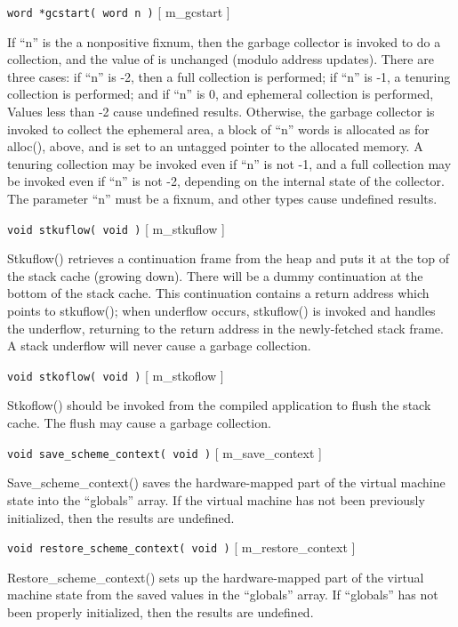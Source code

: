 \begin{description}
\item {{\tt word *gcstart( word n )} \hfill [ {\sc m\_gcstart} ] }

If ``n'' is the a nonpositive fixnum, then the garbage collector is
invoked to do a collection, and the value of  is unchanged
(modulo address updates). There are three cases: if ``n'' is -2, then
a full collection is performed; if ``n'' is -1, a tenuring collection
is performed; and if ``n'' is 0, and ephemeral collection is
performed, Values less than -2 cause undefined results.  Otherwise,
the garbage collector is invoked to collect the ephemeral area, a
block of ``n'' words is allocated as for alloc(), above, and
 is set to an untagged pointer to the allocated memory. A
tenuring collection may be invoked even if ``n'' is not -1, and a full
collection may be invoked even if ``n'' is not -2, depending on the
internal state of the collector.  The parameter ``n'' must be a
fixnum, and other types cause undefined results.

\item {{\tt void stkuflow( void )} \hfill [ {\sc m\_stkuflow} ]}

Stkuflow() retrieves a continuation frame from the heap and puts it at
the top of the stack cache (growing down). There will be a dummy
continuation at the bottom of the stack cache. This continuation
contains a return address which points to stkuflow(); when underflow
occurs, stkuflow() is invoked and handles the underflow, returning to
the return address in the newly-fetched stack frame. A stack underflow
will never cause a garbage collection.

\item {{\tt void stkoflow( void )} \hfill [ {\sc m\_stkoflow} ] }

Stkoflow() should be invoked from the compiled application to flush the
stack cache. The flush may cause a garbage collection. 

\item {{\tt void save\_scheme\_context( void )} \hfill [ {\sc m\_save\_context} ] }

Save\_scheme\_context() saves the hardware-mapped part of the virtual machine
state into the ``globals'' array. If the virtual machine has not been
previously initialized, then the results are undefined.

\item {{\tt void restore\_scheme\_context( void )} \hfill [ {\sc m\_restore\_context} ]}

Restore\_scheme\_context() sets up the hardware-mapped part of the virtual
machine state from the saved values in the ``globals'' array. If ``globals''
has not been properly initialized, then the results are undefined. 


\end{description}

